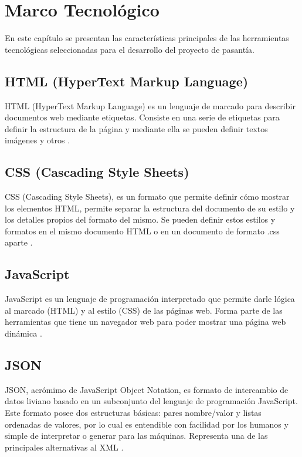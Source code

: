 \chapter{Marco Tecnológico} \label{chap:Marco Tecnologico}

\vspace{5 mm}

En este capítulo se presentan las características principales de las herramientas tecnológicas seleccionadas para el desarrollo del proyecto de pasantía. 

\section{HTML (HyperText Markup Language)} \label{sect:HTML}
HTML (HyperText Markup Language) es un lenguaje de marcado para describir documentos web mediante etiquetas. Consiste en una serie de etiquetas para definir la estructura de la página y mediante ella se pueden definir textos imágenes y otros \cite{HTML}. 

\section{CSS (Cascading Style Sheets)} \label{sect:CSS}
CSS (Cascading Style Sheets), es un formato que permite definir cómo mostrar los elementos HTML, permite separar la estructura del documento de su estilo y los detalles propios del formato del mismo. Se pueden definir estos estilos y formatos en el mismo documento HTML o en un documento de formato .css aparte \cite{CSS}. 

\section{JavaScript} \label{sect:JavaScript}
JavaScript es un lenguaje de programación interpretado que permite darle lógica al marcado (HTML) y al estilo (CSS) de las páginas web. Forma parte de las herramientas que tiene un navegador web para poder mostrar una página web dinámica \cite{JS0}.

\section{JSON} \label{sect:JSON}
JSON, acrómimo de JavaScript Object Notation, es formato de intercambio de datos liviano basado en un subconjunto del lenguaje de programación JavaScript. Este formato posee dos estructuras básicas: pares nombre/valor y listas ordenadas de valores, por lo cual es entendible con facilidad por los humanos y simple de interpretar o generar para las máquinas. Representa una de las principales alternativas al XML \cite{JSON}. 

